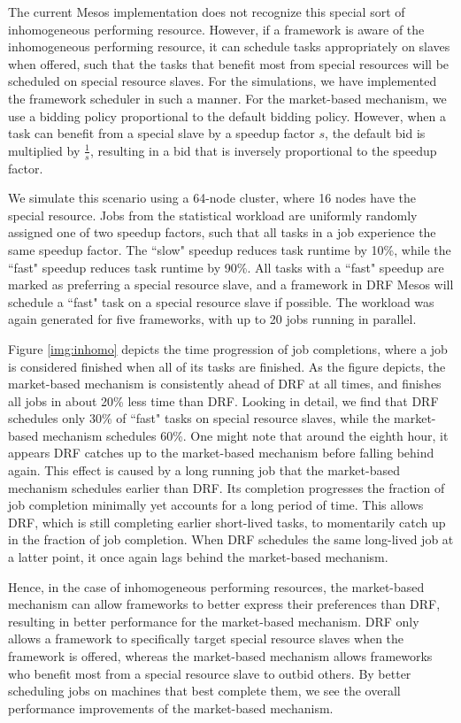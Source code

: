 \documentclass{acm_proc_article-sp}
\begin{document}
The current Mesos implementation does not recognize this special sort of inhomogeneous performing resource. However, if a framework is aware of the inhomogeneous performing resource, it can schedule tasks appropriately on slaves when offered, such that the tasks that benefit most from special resources will be scheduled on special resource slaves. For the simulations, we have implemented the framework scheduler in such a manner. For the market-based mechanism, we use a bidding policy proportional to the default bidding policy. However, when a task can benefit from a special slave by a speedup factor $s$, the default bid is multiplied by $\frac{1}{s}$, resulting in a bid that is inversely proportional to the speedup factor.

We simulate this scenario using a 64-node cluster, where 16 nodes have the special resource. Jobs from the statistical workload are uniformly randomly assigned one of two speedup factors, such that all tasks in a job experience the same speedup factor. The ``slow" speedup reduces task runtime by 10\%, while the ``fast" speedup reduces task runtime by 90\%. All tasks with a ``fast" speedup are marked as preferring a special resource slave, and a framework in DRF Mesos will schedule a ``fast" task on a special resource slave if possible. The workload was again generated for five frameworks, with up to 20 jobs running in parallel.

Figure \ref{img:inhomo} depicts the time progression of job completions, where a job is considered finished when all of its tasks are finished. As the figure depicts, the market-based mechanism is consistently ahead of DRF at all times, and finishes all jobs in about 20\% less time than DRF. Looking in detail, we find that DRF schedules only 30\% of ``fast" tasks on special resource slaves, while the market-based mechanism schedules 60\%. One might note that around the eighth hour, it appears DRF catches up to the market-based mechanism before falling behind again. This effect is caused by a long running job that the market-based mechanism schedules earlier than DRF. Its completion progresses the fraction of job completion minimally yet accounts for a long period of time. This allows DRF, which is still completing earlier short-lived tasks, to momentarily catch up in the fraction of job completion. When DRF schedules the same long-lived job at a latter point, it once again lags behind the market-based mechanism.

Hence, in the case of inhomogeneous performing resources, the market-based mechanism can allow frameworks to better express their preferences than DRF, resulting in better performance for the market-based mechanism. DRF only allows a framework to specifically target special resource slaves when the framework is offered, whereas the market-based mechanism allows frameworks who benefit most from a special resource slave to outbid others. By better scheduling jobs on machines that best complete them, we see the overall performance improvements of the market-based mechanism.
\end{document}
